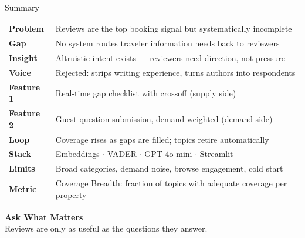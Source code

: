 \documentclass[aspectratio=169,10pt]{beamer}
\begin{document}
\begin{frame}{Summary}

\begin{center}
\begin{tabular}{ll}
  \textbf{Problem}    & Reviews are the top booking signal but systematically incomplete \\[0.4em]
  \textbf{Gap}        & No system routes traveler information needs back to reviewers \\[0.4em]
  \textbf{Insight}    & Altruistic intent exists --- reviewers need direction, not pressure \\[0.4em]
  \textbf{Voice}      & Rejected: strips writing experience, turns authors into respondents \\[0.4em]
  \textbf{Feature 1}  & Real-time gap checklist with crossoff (supply side) \\[0.4em]
  \textbf{Feature 2}  & Guest question submission, demand-weighted (demand side) \\[0.4em]
  \textbf{Loop}       & Coverage rises as gaps are filled; topics retire automatically \\[0.4em]
  \textbf{Stack}      & Embeddings $\cdot$ VADER $\cdot$ GPT-4o-mini $\cdot$ Streamlit \\[0.4em]
  \textbf{Limits}     & Broad categories, demand noise, browse engagement, cold start \\[0.4em]
  \textbf{Metric}     & Coverage Breadth: fraction of topics with adequate coverage per property \\
\end{tabular}
\end{center}

\bigskip
\begin{center}
  \large\textbf{Ask What Matters}\\[0.3em]
  \normalsize Reviews are only as useful as the questions they answer.
\end{center}

\end{frame}
\end{document}
